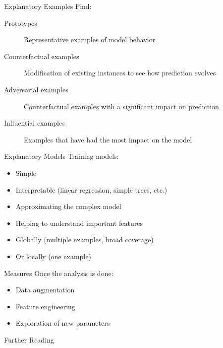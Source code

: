 \begin{frame}{Explanatory Examples}
  Find:
  \begin{description}
    \item[Prototypes] Representative examples of model behavior
    \item[Counterfactual examples] Modification of existing instances to see how prediction evolves
    \item[Adversarial examples] Counterfactual examples with a significant impact on prediction
    \item[Influential examples] Examples that have had the most impact on the model
  \end{description}
\end{frame}

\begin{frame}{Explanatory Models}
  Training models:
  \begin{itemize}
    \item Simple
    \item Interpretable (linear regression, simple trees, etc.)
    \item Approximating the complex model
    \item Helping to understand important features
    \item Globally (multiple examples, broad coverage)
    \item Or locally (one example)
  \end{itemize}
\end{frame}

\begin{frame}{Measures}
  Once the analysis is done:
  
  \begin{itemize}
    \item Data augmentation
    \item Feature engineering
    \item Exploration of new parameters
  \end{itemize}
\end{frame}

\begin{frame}{Further Reading}
\end{frame}